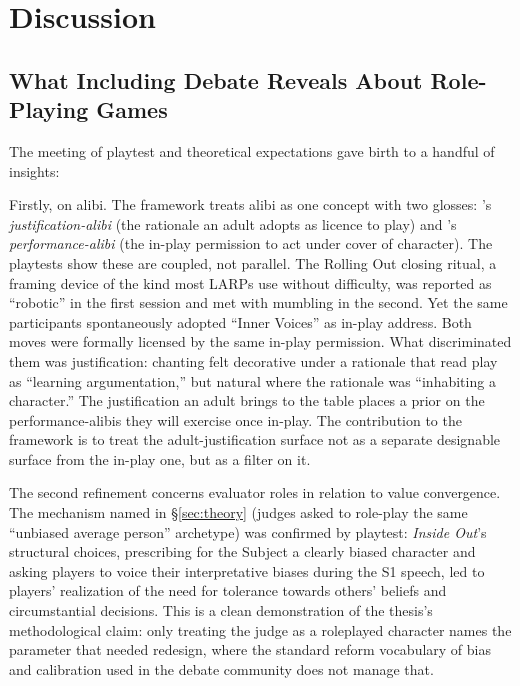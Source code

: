 \section{Discussion}
\label{sec:discussion}

\subsection{What Including Debate Reveals About Role-Playing Games}
\label{sec:rpg-insights}

The meeting of playtest and theoretical expectations gave birth to a handful of insights:

Firstly, on alibi. The framework treats alibi as one concept with two glosses: \textcite{deterding2017alibis}'s \textit{justification-alibi} (the rationale an adult adopts as licence to play) and \textcite{bowman2025transformative}'s \textit{performance-alibi} (the in-play permission to act under cover of character). The playtests show these are coupled, not parallel. The Rolling Out closing ritual, a framing device of the kind most LARPs use without difficulty, was reported as ``robotic'' in the first session and met with mumbling in the second. Yet the same participants spontaneously adopted ``Inner Voices'' as in-play address. Both moves were formally licensed by the same in-play permission. What discriminated them was justification: chanting felt decorative under a rationale that read play as ``learning argumentation,'' but natural where the rationale was ``inhabiting a character.'' The justification an adult brings to the table places a prior on the performance-alibis they will exercise once in-play. The contribution to the framework is to treat the adult-justification surface not as a separate designable surface from the in-play one, but as a filter on it.

The second refinement concerns evaluator roles in relation to value convergence. The mechanism named in §\ref{sec:theory} (judges asked to role-play the same ``unbiased average person'' archetype) was confirmed by playtest: \emph{Inside Out}'s structural choices, prescribing for the Subject a clearly biased character and asking players to voice their interpretative biases during the S1 speech, led to players' realization of the need for tolerance towards others' beliefs and circumstantial decisions. This is a clean demonstration of the thesis's methodological claim: only treating the judge as a roleplayed character names the parameter that needed redesign, where the standard reform vocabulary of bias and calibration used in the debate community does not manage that.

